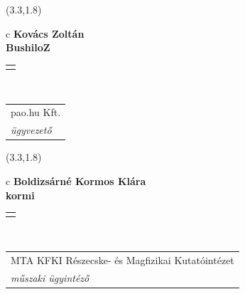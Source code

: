 \documentclass[11pt]{article}
\begin{document}
\makebox(3.3,1.8){
  \renewcommand\arraystretch{1.3}
  \begin{tabular}[c]{c}
    \hspace{8.5mm}
    \LARGE\bf{ Kovács Zoltán }\\
    \hspace{8.5mm}
    \Large{ BushiloZ }\\
    \renewcommand\arraystretch{3}
    \begin{tabular}[c]{c}
      \centering
      \fontfamily{phv}\selectfont{
        \textbf{
          \textsc{
            \scriptsize{
            \color{Bright}{ Ismerkedő }\color{Dark}{ Webmester }\color{Dark}{ Sminkmester }\color{Bright}{ Programozó }
            }
          }
        }
      }
    \end{tabular}
    \\
    \renewcommand\arraystretch{1}
    \begin{tabular}{p{3.3in}}
      \hspace{.7cm}pao.hu Kft.\\
      \hspace{.7cm}\emph{ ügyvezető }\\
    \end{tabular}
  \end{tabular}
}

\makebox(3.3,1.8){
  \renewcommand\arraystretch{1.3}
  \begin{tabular}[c]{c}
    \hspace{10mm}
    \Large\bf{Boldizsárné Kormos Klára}\\
    \hspace{8.5mm}
    \Large{ kormi }\\
    \renewcommand\arraystretch{3}
    \begin{tabular}[c]{c}
      \centering
      \fontfamily{phv}\selectfont{
        \textbf{
          \textsc{
            \scriptsize{
            \color{Bright}{ Ismerkedő }\color{Dark}{ Webmester }\color{Bright}{ Sminkmester }\color{Bright}{ Programozó }
            }
          }
        }
      }
    \end{tabular}
    \\
    \renewcommand\arraystretch{1}
    \begin{tabular}{p{3.3in}}
      \hspace{.7cm}\footnotesize{MTA KFKI Részecske- és Magfizikai Kutatóintézet}\\
      \hspace{.7cm}\emph{ műszaki ügyintéző }\\
    \end{tabular}
  \end{tabular}
}
\end{document}
